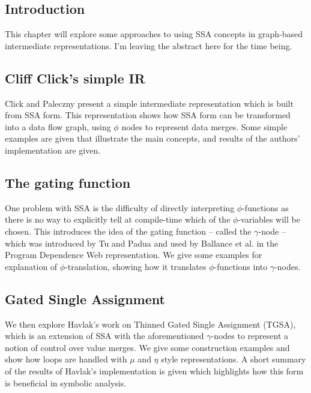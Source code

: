 \subsection*{Introduction}

This chapter will explore some approaches to using SSA concepts in graph-based intermediate representations. I'm leaving the abstract here for the time being.

\subsection*{Cliff Click's simple IR}

Click and Paleczny  \cite{202534} present a simple intermediate representation which is built from SSA form. This representation shows how SSA form can be transformed into a data flow graph, using $\phi$ nodes to represent data merges. Some simple examples are given that illustrate the main concepts, and results of the authors' implementation are given.

\subsection*{The gating function}

One problem with SSA is the difficulty of directly interpreting $\phi$-functions as there is no way to explicitly tell at compile-time which of the $\phi$-variables will be chosen. This introduces the idea of the gating function -- called the $\gamma$-node -- which was introduced by Tu and Padua \cite{207115} and used by Ballance et al. in the Program Dependence Web\cite{93578} representation. We give some examples for explanation of $\phi$-translation, showing how it translates $\phi$-functions into $\gamma$-nodes.

\subsection*{Gated Single Assignment}

We then explore Havlak's work\cite{Havlak93constructionof} on Thinned Gated Single Assignment (TGSA), which is an extension of SSA with the aforementioned $\gamma$-nodes to represent a notion of control over value merges. We give some construction examples and show how loops are handled with $\mu$ and $\eta$ style representations. A short summary of the results of Havlak's implementation is given which highlights how this form is beneficial in symbolic analysis.

